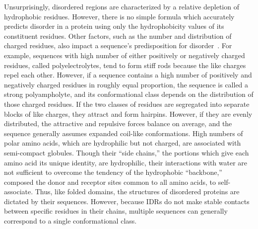 Unsurprisingly, disordered regions are characterized by a relative depletion of hydrophobic residues. However, there is no simple formula which accurately predicts disorder in a protein using only the hydrophobicity values of its constituent residues. Other factors, such as the number and distribution of charged residues, also impact a sequence's predisposition for disorder~\cite{vanderLee2014, Das2015}. For example, sequences with high number of either positively or negatively charged residues, called polyelectrolytes, tend to form stiff rods because the like charges repel each other. However, if a sequence contains a high number of positively and negatively charged residues in roughly equal proportion, the sequence is called a strong polyampholyte, and its conformational class depends on the distribution of those charged residues. If the two classes of residues are segregated into separate blocks of like charges, they attract and form hairpins. However, if they are evenly distributed, the attractive and repulsive forces balance on average, and the sequence generally assumes expanded coil-like conformations. High numbers of polar amino acids, which are hydrophilic but not charged, are associated with semi-compact globules. Though their ``side chains,'' the portions which give each amino acid its unique identity, are hydrophilic, their interactions with water are not sufficient to overcome the tendency of the hydrophobic ``backbone,'' composed the donor and receptor sites common to all amino acids, to self-associate. Thus, like folded domains, the structures of disordered proteins are dictated by their sequences. However, because IDRs do not make stable contacts between specific residues in their chains, multiple sequences can generally correspond to a single conformational class.

